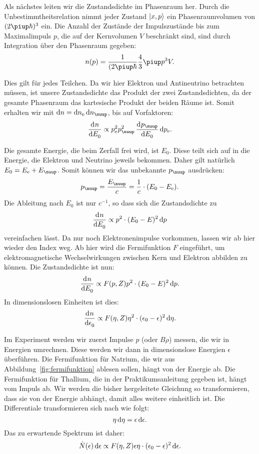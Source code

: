 \documentclass[11pt, ngerman, fleqn, DIV=15, headinclude, BCOR=2cm]{scrreprt}
\begin{document}
Als nächstes leiten wir die Zustandsdichte im Phasenraum her. Durch die
Unbestimmtheitsrelation nimmt jeder Zustand $\ket{x, p}$ ein Phasenraumvolumen
von $(2\piup\hbar)^3$ ein. Die Anzahl der Zustände der Impulszustände bis zum
Maximalimpuls $p$, die auf der Kernvolumen $V$ beschränkt sind, sind durch
Integration über den Phasenraum gegeben:
\[
    n(p) = \frac{1}{(2\piup\hbar} \frac 43 \piup p^3 V.
\]

Dies gilt für jedes Teilchen. Da wir hier Elektron und Antineutrino betrachten
müssen, ist unsere Zustandsdichte das Produkt der zwei Zustandsdichten, da der
gesamte Phasenraum das kartesische Produkt der beiden Räume ist. Somit erhalten
wir mit $\dif n = \dif n_{\text e} \dif n_\nuup$, bis auf Vorfaktoren:
\[
    \dod n{E_0} \propto p_{\text e}^2 p_\nuup^2 \dod{p_\nuup}{E_0} \dif
    p_{\text e}.
\]

Die gesamte Energie, die beim Zerfall frei wird, ist $E_0$. Diese teilt sich
auf in die Energie, die Elektron und Neutrino jeweils bekommen. Daher gilt
natürlich $E_0 = E_{\text e} + E_\nuup$. Somit können wir das unbekannte
$p_\nuup$ ausdrücken:
\[
    p_\nuup = \frac{E_\nuup}{c} = \frac 1c \cdot (E_0 - E_{\text e}).
\]
Die Ableitung nach $E_0$ ist nur $c^{-1}$, so dass sich die Zustandsdichte zu
\[
    \dod n{E_0} \propto p^2 \cdot (E_0 - E)^2 \dif p
\]
vereinfachen lässt. Da nur noch Elektronenimpulse vorkommen, lassen wir ab hier
wieder den Index weg. Ab hier wird die Fermifunktion $F$ eingeführt, um
elektromagnetische Wechselwirkungen zwischen Kern und Elektron abbilden zu
können. Die Zustandsdichte ist nun:
\[
    \dod n{E_0} \propto F(p, Z) p^2 \cdot (E_0 - E)^2 \dif p.
\]
In dimensionslosen Einheiten ist dies:
\[
    \dod n{\epsilon_0} \propto F(\eta, Z) \eta^2 \cdot (\epsilon_0 -
    \epsilon)^2 \dif \eta.
\]

Im Experiment werden wir zuerst Impulse $p$ (oder $B\rho$) messen, die wir in
Energien umrechnen. Diese werden wir dann in dimensionslose Energien $\epsilon$
überführen. Die Fermifunktion für Natrium, die wir aus
Abbildung~\ref{fig:fermifunktion} ablesen sollen, hängt von der Energie ab. Die
Fermifunktion für Thallium, die in der Praktikumsanleitung gegeben ist, hängt
vom Impuls ab. Wir werden die bisher hergeleitete Gleichung so transformieren,
dass sie von der Energie abhängt, damit alles weitere einheitlich ist. Die
Differentiale transformieren sich nach
\parencite[(135)]{Riezler/Kernphysikalisches} wie folgt:
\[
    \eta \dif \eta = \epsilon \dif \epsilon.
\]
Das zu erwartende Spektrum ist daher:
\[
    \dot N(\epsilon) \dif \epsilon \propto F(\eta, Z) \epsilon\eta \cdot (\epsilon_0 -
    \epsilon)^2 \dif \epsilon.
\]
\end{document}
